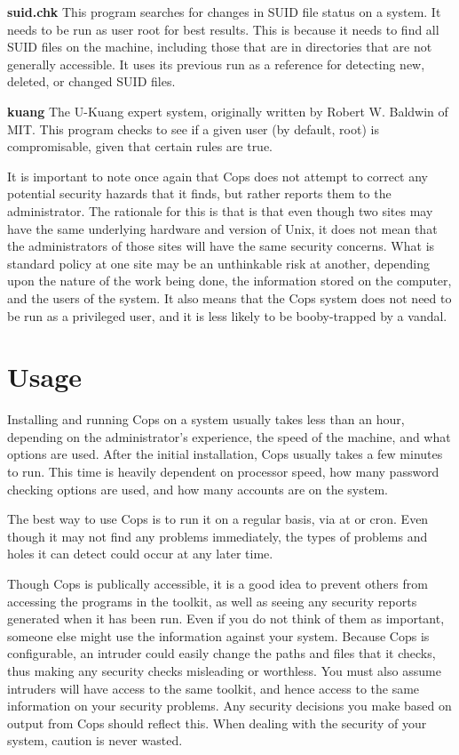 \begin{description}
\item{\bf suid.chk}
This program searches for changes in SUID file
status on a system. It needs to be run as user root for best results. This
is because it needs to find all SUID files on the machine, including
those that are in directories that are not generally accessible.  It
uses its previous run as a reference for detecting new, deleted, or
changed SUID files.

\item{\bf kuang}
The U-Kuang expert system, originally written by Robert W. Baldwin of
MIT.  This program checks to see if a given user (by default,
root) is compromisable, given that certain rules are true.
\end{description}

It is important to note once again that {\sc Cops} does not attempt to
correct any potential security hazards that it finds, but rather
reports them to the administrator.  The rationale for this is that is
that even though two sites may have the same underlying hardware and
version of {\sc Unix}, it does not mean that the administrators of
those sites will have the same security concerns.  What is standard
policy at one site may be an unthinkable risk at another, depending
upon the nature of the work being done, the information stored on the
computer, and the users of the system.  It also means that the {\sc
Cops} system
does not need to be run as a privileged user, and it is less likely to
be booby-trapped by a vandal.

\section{Usage}

Installing and running {\sc Cops} on a system usually takes less than
an hour, depending on the administrator's experience, the speed of the
machine, and what options are used.  After the initial installation,
{\sc Cops} usually takes a few minutes to run. This time is heavily
dependent on processor speed, how many password checking options are
used, and how many accounts are on the system.

The best way to use {\sc Cops} is to run it on a regular basis, via
{\sf at} or {\sf cron}.  Even though it may not find any problems
immediately, the types of problems and holes it can detect could occur
at any later time.

Though {\sc Cops} is publically accessible, it is a good idea to
prevent others from accessing the programs in the toolkit, as well as
seeing any security reports generated when it  has been run.
Even if you do not think of them as important, someone else might use
the information against your system.  Because {\sc Cops}  is
configurable, an intruder could easily change the paths and files that
it checks, thus making any security checks misleading or
worthless. You must also assume intruders will have access to the
same toolkit, and hence access to the same information on your
security problems.  Any security decisions you make based on output
from {\sc Cops} should reflect this.  When dealing with the security of
your system, caution is  never wasted.

